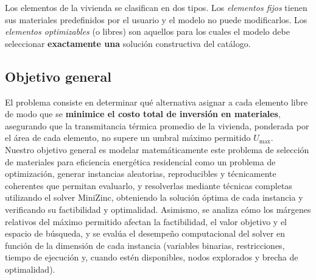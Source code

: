 Los elementos de la vivienda se clasifican en dos tipos. Los \textit{elementos
fijos} tienen sus materiales predefinidos por el usuario y el modelo no puede modificarlos. Los \textit{elementos optimizables} (o libres) son aquellos para los cuales el modelo debe seleccionar \textbf{exactamente una} solución constructiva del catálogo.\\

\subsection{Objetivo general}
El problema consiste en determinar qué alternativa asignar a cada elemento libre de modo que se \textbf{minimice el costo total de inversión en materiales}, asegurando que la transmitancia térmica promedio de la vivienda, ponderada por el área de cada elemento, no supere un umbral máximo permitido $U_{\max}$.\\

Nuestro objetivo general es modelar matemáticamente este problema de selección de materiales para eficiencia energética residencial como un problema de optimización, generar instancias aleatorias, reproducibles y técnicamente coherentes que permitan evaluarlo, y resolverlas mediante técnicas completas utilizando el solver MiniZinc, obteniendo la solución óptima de cada instancia y verificando su factibilidad y optimalidad. Asimismo, se analiza cómo los márgenes relativos del máximo permitido afectan la factibilidad, el valor objetivo y el espacio de búsqueda, y se evalúa el desempeño computacional del solver en función de la dimensión de cada instancia (variables binarias, restricciones, tiempo de ejecución y, cuando estén disponibles, nodos explorados y brecha de optimalidad).

